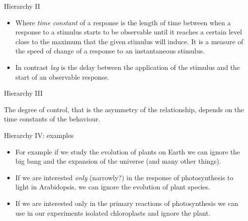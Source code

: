 \documentclass[10pt]{beamer}
\begin{document}
\begin{frame}{Hierarchy II}
\begin{itemize}
\item Where \textit{time constant} of a response is the length of time
between when a response to a stimulus starts to be observable until
it reaches a certain level close to the maximum that the given
stimulus will induce. It is a measure of the speed of change of a
response to an instantaneous stimulus.

\item In contrast \textit{lag} is the delay between the application of
the stimulus and the start of an observable response.
\end{itemize}
\end{frame}

\begin{frame}{Hierarchy III}

The degree of control, that is the asymmetry of the relationship,
depends on the time constants of the behaviour.

  

 \DExamples{}

\end{frame}

\begin{frame}{Hierarchy IV: examples}
\begin{itemize}
\item For example if we study the evolution of plants on Earth we can
ignore the big bang and the expansion of the universe (and many
other things).

\item If we are interested \emph{only} (narrowly?) in the response of photosynthesis to light
in Arabidopsis, we can ignore the evolution of plant species.

\item If we are interested only in the primary reactions of photosynthesis
we can use in our experiments isolated chloroplasts and ignore the
plant.
\end{itemize}
\end{frame}
\end{document}
